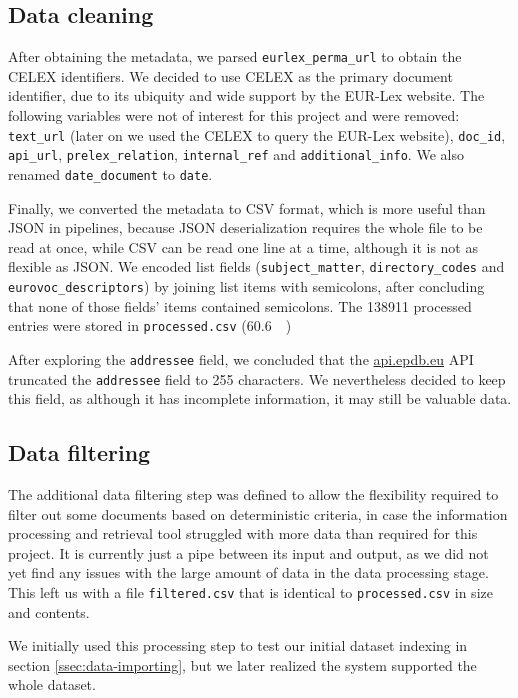\documentclass[sigconf, authorversion]{acmart}
\begin{document}
\subsection{Data cleaning}
\label{ssec:data-cleaning}

After obtaining the metadata, we parsed \texttt{eurlex\_perma\_url} to obtain the CELEX identifiers. We decided to use CELEX as the primary document identifier, due to its ubiquity and wide support by the EUR-Lex website.
The following variables were not of interest for this project and were removed: \texttt{text\_url} (later on we used the CELEX to query the EUR-Lex website), \texttt{doc\_id}, \texttt{api\_url}, \texttt{prelex\_relation}, \texttt{internal\_ref} and \texttt{additional\_info}. We also renamed \texttt{date\_document} to \texttt{date}.

Finally, we converted the metadata to CSV format, which is more useful than JSON in pipelines, because JSON deserialization requires the whole file to be read at once, while CSV can be read one line at a time, although it is not as flexible as JSON. We encoded list fields (\texttt{subject\_matter}, \texttt{directory\_codes} and \texttt{eurovoc\_descriptors}) by joining list items with semicolons, after concluding that none of those fields' items contained semicolons.
The \SI{138911}{} processed entries were stored in \texttt{processed.csv} (\SI{60.6}{\mega\byte})

After exploring the \texttt{addressee} field, we concluded that the \url{api.epdb.eu} API truncated the \texttt{addressee} field to 255 characters. We nevertheless decided to keep this field, as although it has incomplete information, it may still be valuable data.

\subsection{Data filtering}
\label{ssec:filtering}

The additional data filtering step was defined to allow the flexibility required to filter out some documents based on deterministic criteria, in case the information processing and retrieval tool struggled with more data than required for this project. It is currently just a pipe between its input and output, as we did not yet find any issues with the large amount of data in the data processing stage. This left us with a file \texttt{filtered.csv} that is identical to \texttt{processed.csv} in size and contents.

We initially used this processing step to test our initial dataset indexing in section \ref{ssec:data-importing}, but we later realized the system supported the whole dataset.
\end{document}
